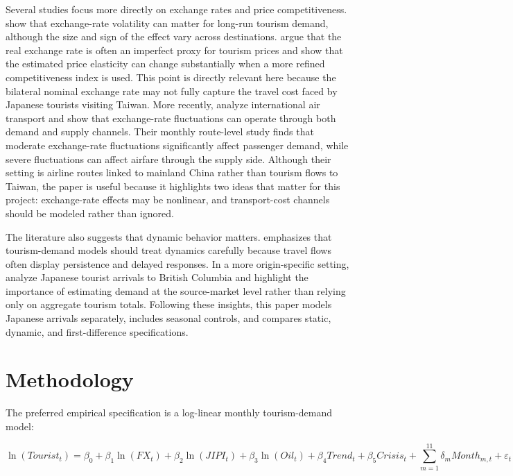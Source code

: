 \documentclass[12pt,a4paper]{article}
\begin{document}
Several studies focus more directly on exchange rates and price competitiveness. \citet{webber2001} show that exchange-rate volatility can matter for long-run tourism demand, although the size and sign of the effect vary across destinations. \citet{seetaram2016} argue that the real exchange rate is often an imperfect proxy for tourism prices and show that the estimated price elasticity can change substantially when a more refined competitiveness index is used. This point is directly relevant here because the bilateral nominal exchange rate may not fully capture the travel cost faced by Japanese tourists visiting Taiwan. More recently, \citet{he2025} analyze international air transport and show that exchange-rate fluctuations can operate through both demand and supply channels. Their monthly route-level study finds that moderate exchange-rate fluctuations significantly affect passenger demand, while severe fluctuations can affect airfare through the supply side. Although their setting is airline routes linked to mainland China rather than tourism flows to Taiwan, the paper is useful because it highlights two ideas that matter for this project: exchange-rate effects may be nonlinear, and transport-cost channels should be modeled rather than ignored.

The literature also suggests that dynamic behavior matters. \citet{morley2009} emphasizes that tourism-demand models should treat dynamics carefully because travel flows often display persistence and delayed responses. In a more origin-specific setting, \citet{huiyuen1998} analyze Japanese tourist arrivals to British Columbia and highlight the importance of estimating demand at the source-market level rather than relying only on aggregate tourism totals. Following these insights, this paper models Japanese arrivals separately, includes seasonal controls, and compares static, dynamic, and first-difference specifications.

\section{Methodology}

The preferred empirical specification is a log-linear monthly tourism-demand model:

\begin{equation}
\ln(Tourist_t) = \beta_0 + \beta_1 \ln(FX_t) + \beta_2 \ln(JIPI_t) + \beta_3 \ln(Oil_t) + \beta_4 Trend_t + \beta_5 Crisis_t + \sum_{m=1}^{11} \delta_m Month_{m,t} + \varepsilon_t
\end{equation}
\end{document}
